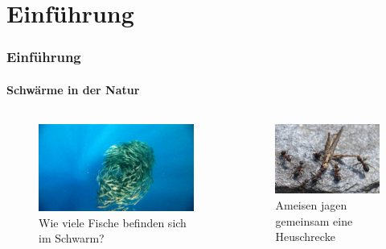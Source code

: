 \documentclass{beamer}
\begin{document}
\section{Einf\"uhrung}


\begin{frame}
	\frametitle{Einf\"uhrung}\framesubtitle{Schw\"arme in der Natur}
	
	\begin{columns}
		\begin{column}{0.5\textwidth}
			\begin{figure}
				\centering
				\includegraphics[width=\textwidth]{bilder/Schwarm_Fische2.jpg}
				\caption{Wie viele Fische befinden sich im Schwarm?}
			\end{figure}
		\end{column}
		\begin{column}{0.5\textwidth}
			\begin{figure}
				\centering
				\includegraphics[width=\textwidth]{bilder/Ameisen_jagen_Wurm.jpg}
				\caption{Ameisen jagen gemeinsam eine Heuschrecke}
			\end{figure}
		\end{column}
	\end{columns}
	
\end{frame}
\end{document}
